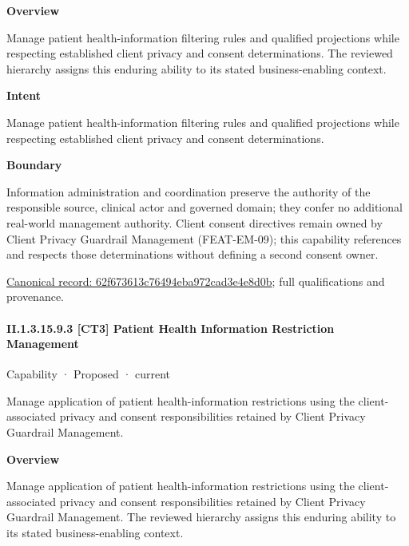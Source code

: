 \textbf{Overview}



Manage patient health-information filtering rules and qualified projections while respecting established client privacy and consent determinations. The reviewed hierarchy assigns this enduring ability to its stated business-enabling context.



\textbf{Intent}



Manage patient health-information filtering rules and qualified projections while respecting established client privacy and consent determinations.



\textbf{Boundary}



Information administration and coordination preserve the authority of the responsible source, clinical actor and governed domain; they confer no additional real-world management authority. Client consent directives remain owned by Client Privacy Guardrail Management (FEAT-EM-09); this capability references and respects those determinations without defining a second consent owner.


{\footnotesize \href{../../../../continuum/strategy/capability/62f673613c76494eba972cad3e4e8d0b.md}{Canonical record: 62f673613c76494eba972cad3e4e8d0b}; full qualifications and provenance.}\par
\paragraph*{II.1.3.15.9.3 [CT3] Patient Health Information Restriction Management}
\label{navigation:II.1.3.15.9.3}

\label{element:262366990bda4ac4ace5429269cf6a98}
{\small Capability · Proposed · current}\par

Manage application of patient health-information restrictions using the client-associated privacy and consent responsibilities retained by Client Privacy Guardrail Management.



\textbf{Overview}



Manage application of patient health-information restrictions using the client-associated privacy and consent responsibilities retained by Client Privacy Guardrail Management. The reviewed hierarchy assigns this enduring ability to its stated business-enabling context.



